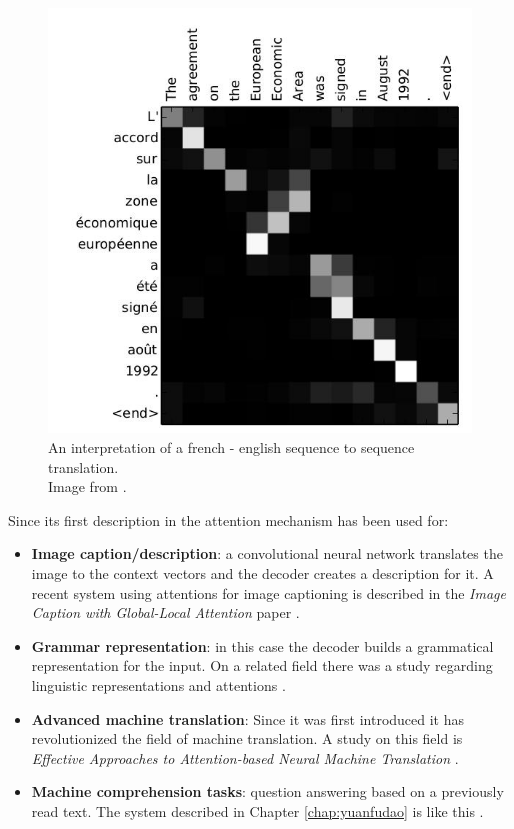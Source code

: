 \begin{figure}[!htb]
	\centering
	\includegraphics[scale=0.5]{interpretation.jpg}
	\caption{An interpretation of a french - english sequence to sequence translation.\\Image from \cite{Bahdanau:2015}.}
	\label{fig:interpretation}
\end{figure}

\begin{minipage}{\linewidth}
	Since its first description in \cite{Bahdanau:2015} the attention mechanism has been used for:
	\begin{itemize}
		\item \textbf{Image caption/description}: a convolutional neural network translates the image to the context vectors and the decoder creates a description for it. A recent system using attentions for image captioning is described in the \textit{Image Caption with Global-Local Attention} paper \cite{Li:2017c}.
		\item \textbf{Grammar representation}: in this case the decoder builds a grammatical representation for the input. On a related field there was a study regarding linguistic representations and attentions \cite{Kadar:2016}.
		\item \textbf{Advanced machine translation}: Since it was first introduced it has revolutionized the field of machine translation. A study on this field is \textit{Effective Approaches to Attention-based Neural Machine Translation} \cite{Luong:2015b}.
		\item \textbf{Machine comprehension tasks}: question answering based on a previously read text. The system described in Chapter \ref{chap:yuanfudao} is like this \cite{Wang:2018}.
	\end{itemize}
\end{minipage}